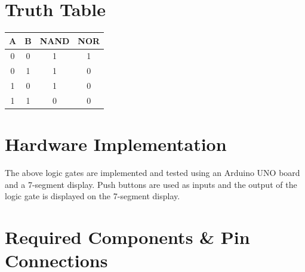 \documentclass[a4paper,12pt]{article}
\begin{document}
\section*{\textbf{Truth Table}}

\begin{center}

\begin{table}[H]
\centering
\begin{tabular}{|c|c|c|c|}
\hline
A & B & NAND & NOR \\ \hline
0 & 0 & 1 & 1 \\ \hline
0 & 1 & 1 & 0 \\ \hline
1 & 0 & 1 & 0 \\ \hline
1 & 1 & 0 & 0 \\ \hline
\end{tabular}

\end{table}

\end{center}

\section*{\textbf{Hardware Implementation}}

The above logic gates are implemented and tested using an Arduino UNO board and a 7-segment display. Push buttons are used as inputs and the output of the logic gate is displayed on the 7-segment display.

\section*{Required Components \& Pin Connections}
\end{document}
